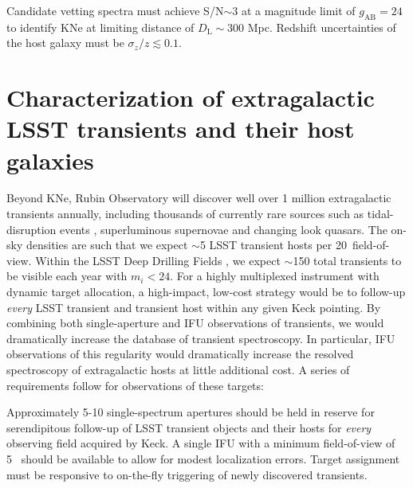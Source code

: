 \documentclass[11pt,a4paper,twoside,onecolumn,openany,final,oldfontcommands]{memoir}
\begin{document}

\begin{sciencerequirement}
\reqitem Candidate vetting spectra must achieve S/N$\sim$3 at a magnitude limit of $g_\mathrm{AB}=24$ to identify KNe at limiting distance of $D_\mathrm{L}\sim300$ Mpc. 
\reqitem Redshift uncertainties of the host galaxy must be $\sigma_z/z \lesssim0.1$.
\end{sciencerequirement}

\section{Characterization of extragalactic LSST transients and their host galaxies}

Beyond KNe, Rubin Observatory will discover well over 1 million extragalactic transients annually, including thousands of currently rare sources such as tidal-disruption events \citep{bricman2020}, superluminous supernovae \citep{villar2018} and changing look quasars.  The on-sky densities are such that we expect $\sim$5 LSST transient hosts per 20\arcmin\ field-of-view.  Within the LSST Deep Drilling Fields , we expect $\sim$150 total transients to be visible each year with $m_i<24$.
For a highly multiplexed instrument with dynamic target allocation, a high-impact, low-cost strategy would be to follow-up \textit{every} LSST transient and transient host within any given Keck pointing.  By combining both single-aperture and IFU observations of transients, we would dramatically increase  the database of transient spectroscopy.  In particular, IFU observations of this regularity would dramatically increase the resolved spectroscopy of extragalactic hosts \citep[see a recent review by][]{anderson2015} at little additional cost. A series of requirements follow for observations of these targets:

\begin{programrequirement}
\reqitem Approximately 5-10 single-spectrum apertures should be held in reserve for serendipitous follow-up of LSST transient objects and their hosts for \textit{every} observing field acquired by Keck.
\reqitem A single IFU with a minimum field-of-view of 5\arcsec\  should be available to allow for modest localization errors.
\reqitem Target assignment must be responsive to on-the-fly triggering of newly discovered transients.
\end{programrequirement}
\end{document}
